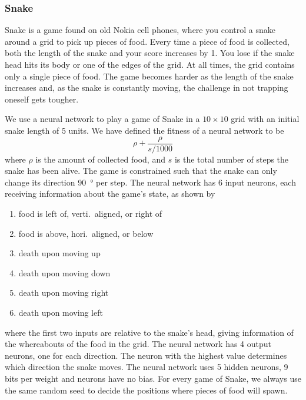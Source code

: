 \subsubsection{Snake}
Snake is a game found on old Nokia cell phones, where you control a snake around a grid to pick up pieces of food.
Every time a piece of food is collected, both the length of the snake and your score increases by 1.
You lose if the snake head hits its body or one of the edges of the grid.
At all times, the grid contains only a single piece of food.
The game becomes harder as the length of the snake increases and, as the snake is constantly moving, the challenge in not trapping oneself gets tougher.

We use a neural network to play a game of Snake in a $10 \times 10$ grid with an initial snake length of 5 units.
We have defined the fitness of a neural network to be 
\[
  \rho + \frac{\rho}{s/1000}
\]
where $\rho$ is the amount of collected food, and $s$ is the total number of steps the snake has been alive. The game is constrained such that the snake can only change its direction \SI{90}{\degree} per step. The neural network has 6 input neurons, each receiving information about the game's state, as shown by
\begin{enumerate}
  \item {} food is left of, verti.\ aligned, or right of
  \item {} food is above, hori.\ aligned, or below
  \item {} death upon moving up 
  \item {} death upon moving down 
  \item {} death upon moving right
  \item {} death upon moving left 
\end{enumerate}
where the first two inputs are relative to the snake's head, giving information of the whereabouts of the food in the grid. The neural network has 4 output neurons, one for each direction. The neuron with the highest value determines which direction the snake moves.
The neural network uses 5 hidden neurons, 9 bits per weight and neurons have no bias.
For every game of Snake, we always use the same random seed to decide the positions where pieces of food will spawn.
